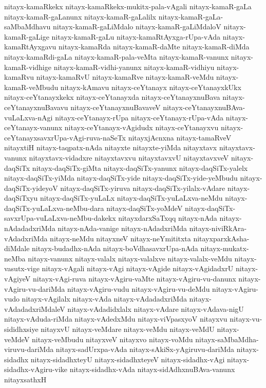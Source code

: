 {nitayx-kamaRkekx
nitayx-kamaRkekx-mukitx-pala-vAgali
nitayx-kamaR-gaLa
nitayx-kamaR-gaLanunx
nitayx-kamaR-gaLalilx
nitayx-kamaR-gaLa-saMbaMdhavu
nitayx-kamaR-gaLiMdalo
nitayx-kamaR-gaLiMdaloV
nitayx-kamaR-gaLige
nitayx-kamaR-gaLu
nitayx-kamaRtAyxga-rUpa-vAda
nitayx-kamaRtAyxgavu
nitayx-kamaRda
nitayx-kamaR-daMte
nitayx-kamaR-diMda
nitayx-kamaRdi-gaLa
nitayx-kamaR-pala-veMta
nitayx-kamaR-vanunx
nitayx-kamaR-vidhige
nitayx-kamaR-vidhi-yanunx
nitayx-kamaR-vidhiyu
nitayx-kamaRvu
nitayx-kamaRvU
nitayx-kamaRve
nitayx-kamaR-veMdu
nitayx-kamaR-veMbudu
nitayx-kAmavu
nitayx-ceYtanayx
nitayx-ceYtanayxkUkx
nitayx-ceYtanayxkekx
nitayx-ceYtanayxda
nitayx-ceYtanayxnuBava
nitayx-ceYtanayxnuBavavu
nitayx-ceYtanayxnuBavaveV
nitayx-ceYtanayxnuBAva-vuLaLxva-nAgi
nitayx-ceYtanayx-rUpa
nitayx-ceYtanayx-rUpa-vAda
nitayx-ceYtanayx-vanunx
nitayx-ceYtanayx-vAgidudx
nitayx-ceYtanayxvu
nitayx-ceYtanayxsavxrUpa-vAgi-ruva-naSeTx
nitayxjAcnxna
nitayx-tamaRveV
nitayxtiH
nitayx-taqpatx-nAda
nitayxte
nitayxte-yiMda
nitayxtavx
nitayxtavx-vanunx
nitayxtavx-vidadxre
nitayxtavxvu
nitayxtavxvU
nitayxtavxveV
nitayx-daqSiTx
nitayx-daqSiTx-giMta
nitayx-daqSiTx-yanunx
nitayx-daqSiTx-yalelx
nitayx-daqSiTx-yiMda
nitayx-daqSiTx-yide
nitayx-daqSiTx-yide-yeMbudu
nitayx-daqSiTx-yideyoV
nitayx-daqSiTx-yiruva
nitayx-daqSiTx-yilalx-vAdare
nitayx-daqSiTxyu
nitayx-daqSiTx-yuLaLx
nitayx-daqSiTx-yuLaLxva-neMdu
nitayx-daqSiTx-yuLaLxva-neMbu-dara
nitayx-daqSiTx-yoMdeV
nitayx-daqSiTx-savxrUpa-vuLaLxva-neMbu-dakekx
nitayxdarxSaTxqq
nitayx-nAda
nitayx-nAdadadxriMda
nitayx-nAda-vanige
nitayx-nAdadxriMda
nitayx-niviRkAra-vAdadxriMda
nitayx-neMdu
nitayxneV
nitayx-neYmititxta
nitayxparxkAsha-diMdale
nitayx-budadhx-nAda
nitayx-boVdhasavxrUpa-nAda
nitayx-mukatx-neMba
nitayx-vanunx
nitayx-valalx
nitayx-valalxve
nitayx-valalx-veMdu
nitayx-vasutx-vige
nitayx-vAgali
nitayx-vAgi
nitayx-vAgide
nitayx-vAgidadxrU
nitayx-vAgiyeV
nitayx-vAgi-ruva
nitayx-vAgiru-vaMte
nitayx-vAgiru-vu-danunx
nitayx-vAgiru-vu-dariMda
nitayx-vAgiru-vudu
nitayx-vAgiru-vu-deMdu
nitayx-vAgiru-vudo
nitayx-vAgilalx
nitayx-vAda
nitayx-vAdadadxriMda
nitayx-vAdadadxriMdaleV
nitayx-vAdadidxlalx
nitayx-vAdare
nitayx-vAdava-nigU
nitayx-vAduda-riMda
nitayx-vAdedxMdu
nitayx-viVpasxyoV
nitayxvu
nitayx-vu-sididhxsiye
nitayxvU
nitayx-veMdare
nitayx-veMdu
nitayx-veMdU
nitayx-veMdeV
nitayx-veMbudu
nitayxveV
nitayxvo
nitayx-voMdu
nitayx-saMbaMdha-viruvu-dariMda
nitayx-sadUrxpa-vAda
nitayx-sAkiSx-yAgiruvu-dariMda
nitayx-sidadhx
nitayx-sidadhxteyU
nitayx-sidadhxteyeV
nitayx-sidadhx-vAgi
nitayx-sidadhx-vAgiru-vike
nitayx-sidadhx-vAda
nitayx-sidAdhxnuBAva-vanunx
nitayxsathxH
}
